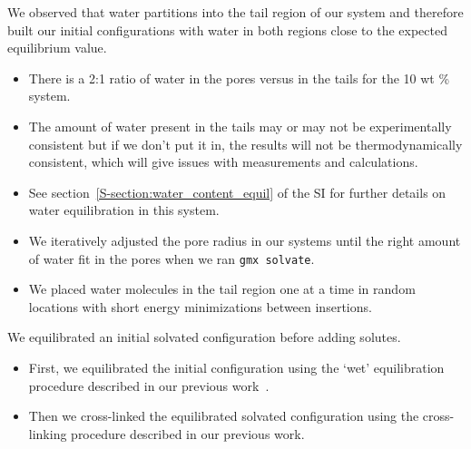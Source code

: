 \documentclass{article}
\begin{document}
  We observed that water partitions into the tail region of our system and therefore
  built our initial configurations with water in both regions close to the expected
  equilibrium value.
  \begin{itemize}
	\item There is a 2:1 ratio of water in the pores versus in the tails for the 10 wt \% system.
	\item The amount of water present in the tails may or may not be experimentally consistent
	but if we don't put it in, the results will not be thermodynamically consistent, which 
	will give issues with measurements and calculations.
	\item See section~\ref{S-section:water_content_equil} of the SI for further details on 
	water equilibration in this system.
	\item We iteratively adjusted the pore radius in our systems until the right amount of water
	fit in the pores when we ran \texttt{gmx solvate}.
	\item We placed water molecules in the tail region one at a time in random locations
	with short energy minimizations between insertions.
  \end{itemize}



  \noindent We equilibrated an initial solvated configuration before adding solutes.
  \begin{itemize}
	\item First, we equilibrated the initial configuration using the `wet'
	equilibration procedure described in our previous work~\cite{coscia_understanding_2019}.
	\item Then we cross-linked the equilibrated solvated configuration using the
	cross-linking procedure described in our previous work.
  \end{itemize}
\end{document}
